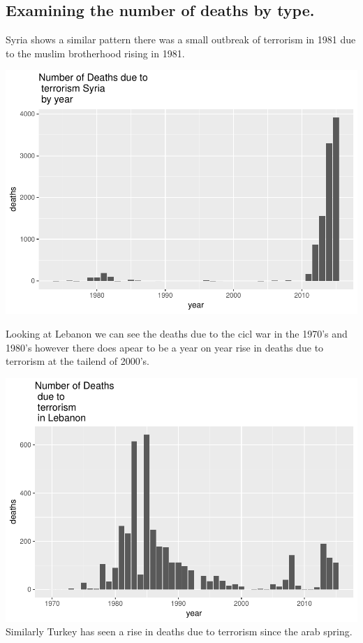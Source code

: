 \documentclass[]{article}
\begin{document}
\subsection{Examining the number of deaths by
type.}\label{examining-the-number-of-deaths-by-type.}

Syria shows a similar pattern there was a small outbreak of terrorism in
1981 due to the muslim brotherhood rising in 1981.

\includegraphics{Peters_experiment_markdown_files/figure-latex/unnamed-chunk-12-1.pdf}

Looking at Lebanon we can see the deaths due to the cicl war in the
1970's and 1980's however there does apear to be a year on year rise in
deaths due to terrorism at the tailend of 2000's.

\includegraphics{Peters_experiment_markdown_files/figure-latex/unnamed-chunk-13-1.pdf}
Similarly Turkey has seen a rise in deaths due to terrorism since the
arab spring.
\end{document}
